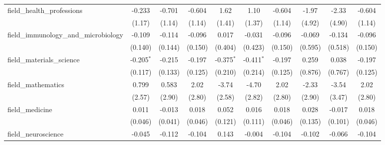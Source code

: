 \begin{tabular}{lccccccccc}
   field\_health\_professions                                  & -0.233         & -0.701         & -0.604        & 1.62           & 1.10           & -0.604        & -1.97        & -2.33       & -0.604\\   
                                                               & (1.17)         & (1.14)         & (1.14)        & (1.41)         & (1.37)         & (1.14)        & (4.92)       & (4.90)      & (1.14)\\   
   field\_immunology\_and\_microbiology                        & -0.109         & -0.114         & -0.096        & 0.017          & -0.031         & -0.096        & -0.069       & -0.134      & -0.096\\   
                                                               & (0.140)        & (0.144)        & (0.150)       & (0.404)        & (0.423)        & (0.150)       & (0.595)      & (0.518)     & (0.150)\\   
   field\_materials\_science                                   & -0.205$^{*}$   & -0.215         & -0.197        & -0.375$^{*}$   & -0.411$^{*}$   & -0.197        & 0.259        & 0.038       & -0.197\\   
                                                               & (0.117)        & (0.133)        & (0.125)       & (0.210)        & (0.214)        & (0.125)       & (0.876)      & (0.767)     & (0.125)\\   
   field\_mathematics                                          & 0.799          & 0.583          & 2.02          & -3.74          & -4.70          & 2.02          & -2.33        & -3.54       & 2.02\\   
                                                               & (2.57)         & (2.90)         & (2.80)        & (2.58)         & (2.82)         & (2.80)        & (2.90)       & (3.47)      & (2.80)\\   
   field\_medicine                                             & 0.011          & -0.013         & 0.018         & 0.052          & 0.016          & 0.018         & 0.028        & -0.017      & 0.018\\   
                                                               & (0.046)        & (0.041)        & (0.046)       & (0.121)        & (0.111)        & (0.046)       & (0.135)      & (0.101)     & (0.046)\\   
   field\_neuroscience                                         & -0.045         & -0.112         & -0.104        & 0.143          & -0.004         & -0.104        & -0.102       & -0.066      & -0.104\\   

\end{tabular}
